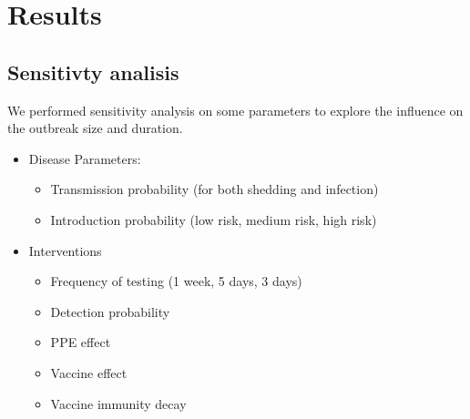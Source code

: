 \documentclass[
]{article}
\providecommand{\tightlist}{%
  \setlength{\itemsep}{0pt}\setlength{\parskip}{0pt}}
\begin{document}
\hypertarget{results}{%
\section{Results}\label{results}}

\hypertarget{sensitivty-analisis}{%
\subsection{Sensitivty analisis}\label{sensitivty-analisis}}

We performed sensitivity analysis on some parameters to explore the
influence on the outbreak size and duration.

\begin{itemize}
\tightlist
\item
  Disease Parameters:

  \begin{itemize}
  \tightlist
  \item
    Transmission probability (for both shedding and infection)
  \item
    Introduction probability (low risk, medium risk, high risk)
  \end{itemize}
\item
  Interventions

  \begin{itemize}
  \tightlist
  \item
    Frequency of testing (1 week, 5 days, 3 days)
  \item
    Detection probability
  \item
    PPE effect
  \item
    Vaccine effect
  \item
    Vaccine immunity decay
  \end{itemize}
\end{itemize}
\end{document}
